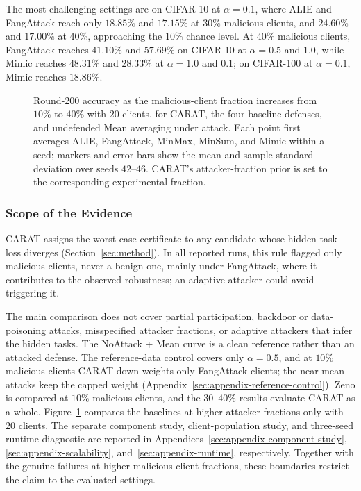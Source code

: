 The most challenging settings are on CIFAR-10 at $\alpha=0.1$, where ALIE and FangAttack reach only $18.85\%$ and $17.15\%$ at $30\%$ malicious clients, and $24.60\%$ and $17.00\%$ at $40\%$, approaching the $10\%$ chance level. At $40\%$ malicious clients, FangAttack reaches $41.10\%$ and $57.69\%$ on CIFAR-10 at $\alpha=0.5$ and $1.0$, while Mimic reaches $48.31\%$ and $28.33\%$ at $\alpha=1.0$ and $0.1$; on CIFAR-100 at $\alpha=0.1$, Mimic reaches $18.86\%$.

\begin{figure}[!t]
  \centering
  \caption{Round-200 accuracy as the malicious-client fraction increases from $10\%$ to $40\%$ with $20$ clients, for CARAT, the four baseline defenses, and undefended Mean averaging under attack. Each point first averages ALIE, FangAttack, MinMax, MinSum, and Mimic within a seed; markers and error bars show the mean and sample standard deviation over seeds $42$--$46$. CARAT's attacker-fraction prior is set to the corresponding experimental fraction.}
  \label{fig:attacker-fraction}
\end{figure}

\subsubsection{Scope of the Evidence}
CARAT assigns the worst-case certificate to any candidate whose hidden-task loss diverges (Section~\ref{sec:method}). In all reported runs, this rule flagged only malicious clients, never a benign one, mainly under FangAttack, where it contributes to the observed robustness; an adaptive attacker could avoid triggering it.

The main comparison does not cover partial participation, backdoor or data-poisoning attacks, misspecified attacker fractions, or adaptive attackers that infer the hidden tasks. The NoAttack + Mean curve is a clean reference rather than an attacked defense. The reference-data control covers only $\alpha=0.5$, and at $10\%$ malicious clients CARAT down-weights only FangAttack clients; the near-mean attacks keep the capped weight (Appendix~\ref{sec:appendix-reference-control}). Zeno is compared at $10\%$ malicious clients, and the $30$--$40\%$ results evaluate CARAT as a whole. Figure~\ref{fig:attacker-fraction} compares the baselines at higher attacker fractions only with $20$ clients. The separate component study, client-population study, and three-seed runtime diagnostic are reported in Appendices~\ref{sec:appendix-component-study}, \ref{sec:appendix-scalability}, and~\ref{sec:appendix-runtime}, respectively. Together with the genuine failures at higher malicious-client fractions, these boundaries restrict the claim to the evaluated settings.

